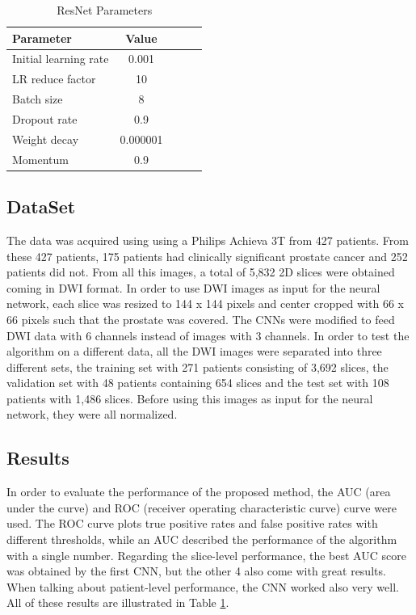 \documentclass[runningheads,a4paper,11pt]{report}
\begin{document}
\begin{table}[htbp]
		\begin{center}
			\begin{tabular}{p{180pt}c c c c}
				\textbf{Parameter}&\textbf{Value}\\
				\hline\hline
 			Initial learning rate& 0.001\\
 			LR reduce factor& 10\\
 			Batch size& 8\\
 			Dropout rate& 0.9\\
 			Weight decay& 0.000001\\
 			Momentum& 0.9\\
			\end{tabular}
		\end{center}
		\caption{ResNet Parameters \cite{deepCNN}}
		\label{tableResults}
\end{table}

\subsection{DataSet}
\label{section:dataset}

The data was acquired using using a Philips Achieva 3T from 427 patients. From these 427 patients, 175 patients had clinically significant prostate cancer and 252 patients did not. From all this images, a total of 5,832 2D slices were obtained coming in DWI format. In order to use DWI images as input for the neural network, each slice was resized to 144 x 144 pixels and center cropped with 66 x 66 pixels such that the prostate was covered. The CNNs were modified to feed DWI data with 6 channels instead of images with 3 channels. In order to test the algorithm on a different data, all the DWI images were separated into three different sets, the training set with 271 patients consisting of 3,692 slices, the validation set with 48 patients containing 654 slices and the test set with 108 patients with 1,486 slices. Before using this images as input for the neural network, they were all normalized.\cite{deepCNN}

\subsection{Results}
\label{section:results}

In order to evaluate the performance of the proposed method, the AUC (area under the curve) and ROC (receiver operating characteristic curve) curve were used. The ROC curve plots true positive rates and false positive rates with different thresholds, while an AUC described the performance of the algorithm with a single number. Regarding the slice-level performance, the best AUC score was obtained by the first CNN, but the other 4 also come with great results. When talking about patient-level performance, the CNN worked also very well.\cite{deepCNN} All of these results are illustrated in Table \ref{tableResults}.
\end{document}
